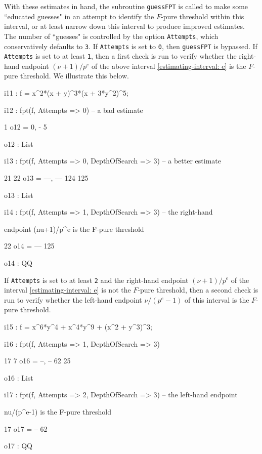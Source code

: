 \documentclass{amsart}
\begin{document}
With these estimates in hand, the subroutine {\tt guessFPT} is called to make some ``educated guesses" in an attempt to identify the $F$-pure threshold within this interval, or at least narrow down this interval to produce improved estimates.  The number of ``guesses" is controlled by the option {\tt Attempts}, which conservatively defaults to {\tt 3}.  If {\tt Attempts} is set to {\tt 0}, then {\tt guessFPT} is bypassed. If  {\tt Attempts} is set to at least {\tt 1}, then a first check is run to verify whether the right-hand endpoint $(\nu+1)/p^e$ of the above interval \eqref{estimating-interval: e} is the $F$-pure threshold.  We illustrate this below.

{\small
{}
\begin{MyVerbatim}

i11 : f = x^2*(x + y)^3*(x + 3*y^2)^5;

i12 : fpt(f, Attempts => 0) -- a bad estimate

          1
o12 = {0, -}
          5

o12 : List

i13 : fpt(f, Attempts => 0, DepthOfSearch => 3) -- a better estimate

        21   22
o13 = {---, ---}
       124  125

o13 : List

i14 : fpt(f, Attempts => 1, DepthOfSearch => 3) -- the right-hand

      endpoint (nu+1)/p^e is the F-pure threshold

       22
o14 = ---
      125

o14 : QQ

\end{MyVerbatim}
}

If  {\tt Attempts} is set to at least {\tt 2} and the right-hand endpoint $(\nu+1)/p^e$ of the interval \eqref{estimating-interval: e} is not the $F$-pure threshold, then a second check is run to verify whether the left-hand endpoint $\nu/(p^e-1)$ of this interval is the $F$-pure threshold.

{\small
{}
\begin{MyVerbatim}

i15 : f = x^6*y^4 + x^4*y^9 + (x^2 + y^3)^3;

i16 : fpt(f, Attempts => 1, DepthOfSearch => 3)

       17   7
o16 = {--, --}
       62  25

o16 : List

i17 : fpt(f, Attempts => 2, DepthOfSearch => 3) -- the left-hand endpoint

      nu/(p^e-1) is the F-pure threshold

      17
o17 = --
      62

o17 : QQ

\end{MyVerbatim}
}
\end{document}
